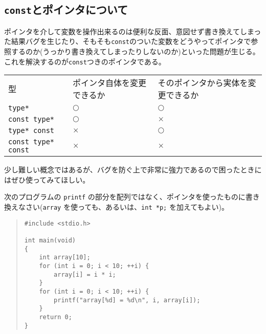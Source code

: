 \subsection{\texttt{const}とポインタについて}
ポインタを介して変数を操作出来るのは便利な反面、意図せず書き換えてしまった結果バグを生じたり、そもそも\texttt{const}のついた変数をどうやってポインタで参照するのか(うっかり書き換えてしまったりしないのか)といった問題が生じる。これを解決するのが\texttt{const}つきのポインタである。

\begin{table}[H]
    \centering
    \begin{tabular}{lll}
        型                         & ポインタ自体を変更できるか & そのポインタから実体を変更できるか \\
        \texttt{type*}             & \(\bigcirc\)               & \(\bigcirc\)                       \\
        \texttt{const type*}       & \(\bigcirc\)               & \(\times\)                         \\
        \texttt{type* const}       & \(\times\)                 & \(\bigcirc\)                       \\
        \texttt{const type* const} & \(\times\)                 & \(\times\)
    \end{tabular}
\end{table} \noindent

少し難しい概念ではあるが、バグを防ぐ上で非常に強力であるので困ったときにはぜひ使ってみてほしい。
\begin{renshuu}\label{prob:5-1}
    次のプログラムの \texttt{printf} の部分を配列ではなく、ポインタを使ったものに書き換えなさい(\texttt{array} を使っても、あるいは、\texttt{int *p;} を加えてもよい)。
\begin{quote}
\begin{verbatim}
#include <stdio.h>

int main(void)
{
    int array[10];
    for (int i = 0; i < 10; ++i) {
        array[i] = i * i;
    }
    for (int i = 0; i < 10; ++i) {
        printf("array[%d] = %d\n", i, array[i]);
    }
    return 0;
}
\end{verbatim}
\end{quote}
\end{renshuu}

